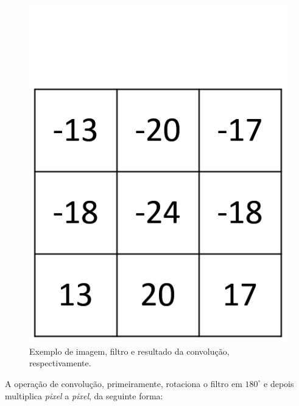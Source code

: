 \documentclass[twoside,twocolumn]{article}
\begin{document}
\begin{figure}[H]
\begin{center}
	\includegraphics[scale=.2]{figures/resultado.png}
\caption{Exemplo de imagem, filtro e resultado da convolução, respectivamente.} \label{gdimotes}
\end{center}
\end{figure}

A operação de convolução, primeiramente, rotaciona o filtro em $180^{\circ}$ e depois multiplica \textit{pixel} a \textit{pixel}, da seguinte forma:
\end{document}
